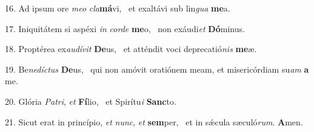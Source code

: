 16. Ad ipsum ore \textit{me}\textit{o} \textit{cla}\textbf{má}vi, \ast\  et exaltávi sub lin\textit{gua} \textbf{me}a.\

17. Iniquitátem si aspéxi \textit{in} \textit{cor}\textit{de} \textbf{me}o, \ast\  non exáudi\textit{et} \textbf{Dó}minus.\

18. Proptérea ex\textit{au}\textit{dí}\textit{vit} \textbf{De}us, \ast\  et atténdit voci deprecatió\textit{nis} \textbf{me}æ.\

19. Be\textit{ne}\textit{díc}\textit{tus} \textbf{De}us, \ast\  qui non amóvit oratiónem meam, et misericórdiam su\textit{am} \textbf{a} me.\

20. Glória \textit{Pa}\textit{tri}, \textit{et} \textbf{Fí}lio, \ast\  et Spirítu\textit{i} \textbf{Sanc}to.\

21. Sicut erat in princípio, \textit{et} \textit{nunc}, \textit{et} \textbf{sem}per, \ast\  et in sǽcula sæculó\textit{rum}. \textbf{A}men.\

